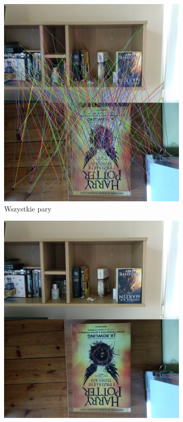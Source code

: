 \documentclass{article}
\begin{document}
	\begin{figure}[H]
		\centering
		\begin{subfigure}[b]{0.4\linewidth}
			\includegraphics[width=\linewidth]{falsea.png}
			\caption{Wszystkie pary}
		\end{subfigure}
		\begin{subfigure}[b]{0.4\linewidth}
			\includegraphics[width=\linewidth]{falsec.png}

\end{subfigure}
\end{figure}
\end{document}
